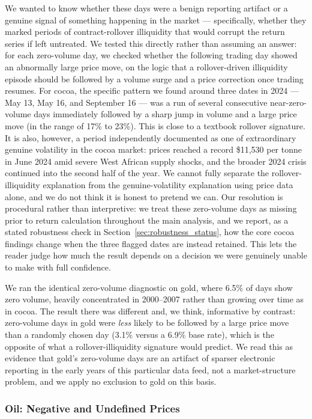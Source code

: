 \documentclass[preprint,12pt,authoryear]{elsarticle}
\begin{document}
We wanted to know whether these days were a benign reporting artifact
or a genuine signal of something happening in the market — specifically,
whether they marked periods of contract-rollover illiquidity that
would corrupt the return series if left untreated. We tested this
directly rather than assuming an answer: for each zero-volume day, we
checked whether the following trading day showed an abnormally large
price move, on the logic that a rollover-driven illiquidity episode
should be followed by a volume surge and a price correction once
trading resumes. For cocoa, the specific pattern we found around three
dates in 2024 — May 13, May 16, and September 16 — was a run of
several consecutive near-zero-volume days immediately followed by a
sharp jump in volume and a large price move (in the range of 17\% to
23\%). This is close to a textbook rollover signature. It is also,
however, a period independently documented as one of extraordinary
genuine volatility in the cocoa market: prices reached a record
\$11{,}530 per tonne in June 2024 amid severe West African supply
shocks, and the broader 2024 crisis continued into the second half of
the year. We cannot fully separate the rollover-illiquidity
explanation from the genuine-volatility explanation using price data
alone, and we do not think it is honest to pretend we can. Our
resolution is procedural rather than interpretive: we treat these
zero-volume days as missing prior to return calculation throughout the
main analysis, and we report, as a stated robustness check in
Section~\ref{sec:robustness_status}, how the core cocoa findings change when the three
flagged dates are instead retained. This lets the reader judge how
much the result depends on a decision we were genuinely unable to make
with full confidence.

We ran the identical zero-volume diagnostic on gold, where 6.5\% of
days show zero volume, heavily concentrated in 2000--2007 rather than
growing over time as in cocoa. The result there was different and, we
think, informative by contrast: zero-volume days in gold were
\emph{less} likely to be followed by a large price move than a
randomly chosen day (3.1\% versus a 6.9\% base rate), which is the
opposite of what a rollover-illiquidity signature would predict. We
read this as evidence that gold's zero-volume days are an artifact of
sparser electronic reporting in the early years of this particular
data feed, not a market-structure problem, and we apply no exclusion
to gold on this basis.

\subsubsection{Oil: Negative and Undefined Prices}
\end{document}
